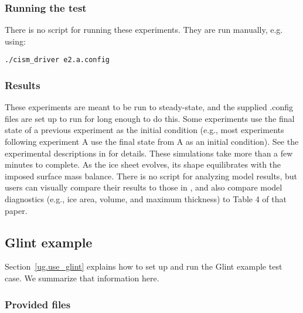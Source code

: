 \subsubsection{Running the test}
There is no script for running these experiments. They are run manually, e.g. using: 

\texttt{./cism\_driver e2.a.config}


\subsubsection{Results}
\label{subsecc:eismint2_results}
These experiments are meant to be run to steady-state, and the supplied .config files are set up to run for long enough to do this.  
Some experiments use the final state of a previous experiment 
as the initial condition (e.g., most experiments following experiment A use the final state from A as an initial condition).  
See the experimental descriptions in \citet{Payne2000} for details.
These simulations take more than a few minutes to complete.
As the ice sheet evolves, its shape equilibrates with the imposed surface mass balance.  
There is no script for analyzing model results, but users can visually compare their results to those in \citet{Payne2000},
and also compare model diagnostics (e.g., ice area, volume, and maximum thickness) to Table 4 of that paper.


\subsection{Glint example}
\label{sec:glint_example}

Section~\ref{ug.use_glint} explains how to set up and run the Glint example test case.
We summarize that information here.

\subsubsection{Provided files}
\label{subsec:glint_files}

